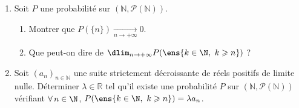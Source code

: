 \begin{enumerate}
\item
Soit $P$ une probabilité sur $(\mathbb{N}, \mathscr{P}(\mathbb{N}))$.
\begin{enumerate}
\item Montrer que $P(\{n\}) \xrightarrow[n \rightarrow+\infty]{ } 0$.
\item Que peut-on dire de $\dlim _{n \rightarrow+\infty} P(\ens{k\in\N,\ k \geqslant n})$ ?
\end{enumerate}
\item Soit $\left(a_n\right)_{n \in \mathbb{N}}$ une suite strictement décroissante de réels positifs de limite nulle.
Déterminer $\lambda \in \mathbb{R}$ tel qu'il existe une probabilité $P$ sur $(\mathbb{N}, \mathscr{P}(\mathbb{N}))$ vérifiant
$\forall\, n\in\N$, $P(\ens{k\in\N,\ k \geqslant n})=\lambda a_n$.
\end{enumerate}
